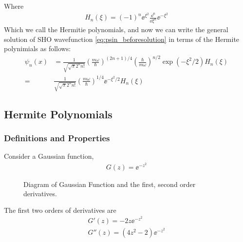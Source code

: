Where 
\begin{eqnarray}
    H_n(\xi) = (-1)^n \ee^{\xi^2} \frac{\dd^n}{\dd \xi^n} \ee^{-\xi^2}
\end{eqnarray}
Which we call the Hermitie polynomials, and now we can write the general solution of SHO wavefunction \cref{eq:psin_beforesolution} in terms of the Hermite polynimials as follows:
\begin{align}
    \psi_n(x) &= \frac{1}{\sqrt{\sqrt\pi 2^n n!}} \left(\frac{m\omega}{\hbar}\right)^{(2n+1)/4} \left(\frac{\hbar}{m \omega}\right)^{n/2} \exp\left(- \xi^2/2\right) H_n(\xi) \\
    =& \frac{1}{\sqrt{\sqrt\pi 2^n n!}} \left(\frac{m \omega}{\hbar}\right)^{1/4} \ee^{-\xi^2/2} H_n(\xi)
\end{align}
\newpage

\subsection{Hermite Polynomials}
\subsubsection{Definitions and Properties}
Consider a Gaussian function,
\begin{eqnarray}
    G(z) = \ee^{- z^2}
\end{eqnarray}

\begin{figure}[h!]
    \centering
    \caption{Diagram of Gaussian Function and the first, second order derivatives.}
    \label{fig:Gaussian}
\end{figure}

The first two orders of derivatives are 
\begin{align}
    G'(z) = - 2 z \ee^{-z^2} \\
    G''(z) = (4z^2-2) \ee^{-z^2}
\end{align}

